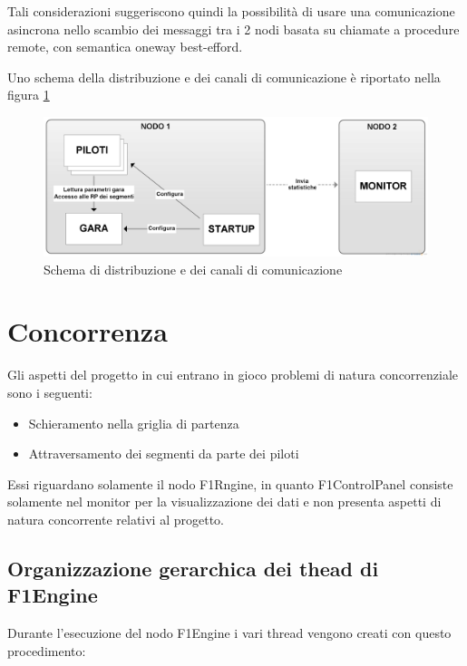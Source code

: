 \documentclass[a4paper,11pt, twoside]{book}
\begin{document}
      Tali considerazioni suggeriscono quindi la possibilità di usare una comunicazione asincrona nello scambio dei messaggi
      tra i 2 nodi basata su chiamate a procedure remote, con semantica oneway best-efford.
            
      Uno schema della distribuzione e dei canali di comunicazione è riportato nella figura \ref{Fig:SchemaDistribuzione}
      
      \begin{figure}[ht]
	\centering
	\includegraphics[width=120mm]{./Immagini/SchemaDistribuzione.png}
	\caption{Schema di distribuzione e dei canali di comunicazione}
	\label{Fig:SchemaDistribuzione}
      \end{figure}
    
  \chapter{Concorrenza}
  \label{Concorenza}
    Gli aspetti del progetto in cui entrano in gioco problemi di natura concorrenziale sono i seguenti:
    
    \begin{itemize}
      \item Schieramento nella griglia di partenza
      \item Attraversamento dei segmenti da parte dei piloti
    \end{itemize}
    
    Essi riguardano solamente il nodo F1Rngine, in quanto F1ControlPanel consiste solamente nel monitor per
    la visualizzazione dei dati e non presenta aspetti di natura concorrente relativi al progetto.
    
    \section{Organizzazione gerarchica dei thead di F1Engine}
      Durante l'esecuzione del nodo F1Engine i vari thread vengono creati con questo procedimento:
      
\end{document}
